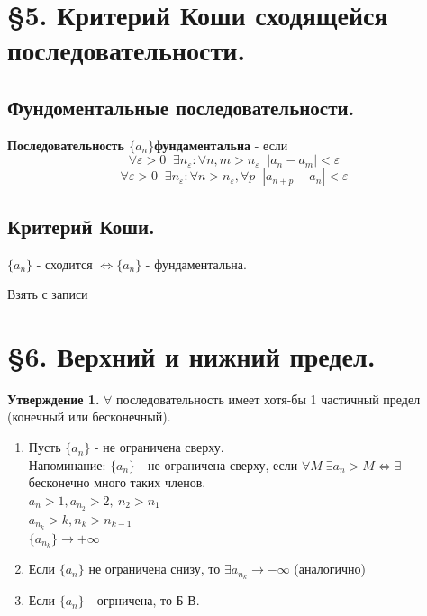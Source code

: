 \documentclass[12pt, paper]{article}
\newcommand{\eps}{\varepsilon}
\begin{document}
\section{\S 5. Критерий Коши сходящейся последовательности.}
\subsection{Фундоментальные последовательности.}
\begin{tcolorbox}
    \textbf{Последовательность $\{a_n\} $фундаментальна} - если
    \[\forall \eps>0 \;\; \exists n_\eps : \forall n, m > n_\eps \;\; |a_n-a_m| < \eps\]
    \[ \forall \eps>0 \;\; \exists n_\eps : \forall n > n_\eps,\forall  p \;\; |a_{n+p}-a_n| < \eps \]
\end{tcolorbox}

\subsection{Критерий Коши.}
\begin{tcolorbox}
    $\{a_n\}$ - сходится $\Leftrightarrow \{a_n\}$ - фундаментальна.
\end{tcolorbox}

\begin{tcolorbox}[title=Доказательство]
    Взять с записи
\end{tcolorbox}

\section{\S 6. Верхний и нижний предел.}
\textbf{Утверждение 1.} $\forall$ последовательность имеет хотя-бы 1 частичный предел (конечный или бесконечный).
\begin{tcolorbox}[title=Доказательство]
    \begin{enumerate}
        \item Пусть $\{a_n\}$ - не ограничена сверху.\\
        Напоминание: $\{ a_n \}$ - не ограничена сверху, если $\forall M\; \exists a_n > M \Leftrightarrow \exists$ бесконечно много таких членов.\\
        $a_n > 1, a_{n_2} > 2,\ n_2>n_1$\\
        $a_{n_k} > k, n_k > n_{k-1}$\\
        $\{a_{n_k}\} \to +\infty$
        \item Если $\{a_n\}$ не ограничена снизу, то $\exists a_{n_k}\to -\infty$ (аналогично)
        \item Если $\{a_n\}$ - огрничена, то Б-В.
        
    \end{enumerate}
\end{tcolorbox}
\end{document}
